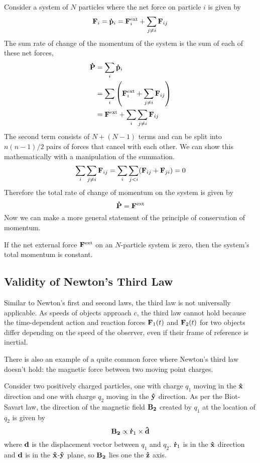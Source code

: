 Consider a system of $N$ particles where the net force on particle $i$ is given by
\[ \mathbf{F}_i = \mathbf{\dot p}_i = \mathbf{F}^{\text{ext}}_i + \sum_{j \neq i} \mathbf{F}_{ij}\]
The sum rate of change of the momentum of the system is the sum of each of these net forces,
\begin{align*}
    \mbf{\dot P} &= \sum_{i} \mbf{\dot p}_i  \\
    &= \sum_{i} \pqty{ \mbf{F}^{\text{ext}}_i + \sum_{j \neq i} \mbf{F}_{ij}} \\
    &= \mbf{F}^{\text{ext}} + \sum_{i}\sum_{j \neq i} \mbf{F}_{ij}
\end{align*}
The second term consists of $N+(N-1)$ terms and can be split into $n(n-1)/2$ pairs of forces that cancel with each other. We can show this mathematically with a manipulation of the summation. 
\[\sum_{i}\sum_{j \neq i} \mathbf{F}_{ij} = \sum_{i}\sum_{j < i}(\mathbf{F}_{ij} + \mathbf{F}_{ji}) = 0 \]
Therefore the total rate of change of momentum on the system is given by
\[ \mathbf{\dot P} = \mathbf{F}^{\text{ext}} \]
Now we can make a more general statement of the principle of conservation of momentum.
\begin{theorem}
    If the net external force $\mathbf{F}^{\text{ext}}$ on an $N$-particle system is zero, then the system's total momentum is constant.
\end{theorem}
\subsection*{Validity of Newton's Third Law}
Similar to Newton's first and second laws, the third law is not universally applicable. As speeds of objects approach $c$, the third law cannot hold because the time-dependent action and reaction forces $\mathbf{F}_1(t)$ and $\mathbf{F}_2(t)$ for two objects differ depending on the speed of the observer, even if their frame of reference is inertial.

There is also an example of a quite common force where Newton's third law doesn't hold: the magnetic force between two moving point charges. 

Consider two positively charged particles, one with charge $q_1$ moving in the $\mathbf{\hat{x}}$ direction and one with charge $q_2$ moving in the $\mathbf{\hat{y}}$ direction. As per the Biot-Savart law, the direction of the magnetic field $\mathbf{B_2}$ created by $q_1$ at the location of $q_2$ is given by 
\[ \mathbf{B_2} \propto \mathbf{\dot r}_1 \times \mathbf{\hat d} \]
where $\mathbf{d}$ is the displacement vector between $q_1$ and $q_2$. $\mathbf{\dot r}_1$ is in the $\mathbf{\hat{x}}$ direction and $\mathbf{d}$ is in the $\mathbf{\hat{x}}$-$\mathbf{\hat{y}}$ plane, so $\mathbf{B_2}$ lies one the $\mathbf{\hat{z}}$ axis.

